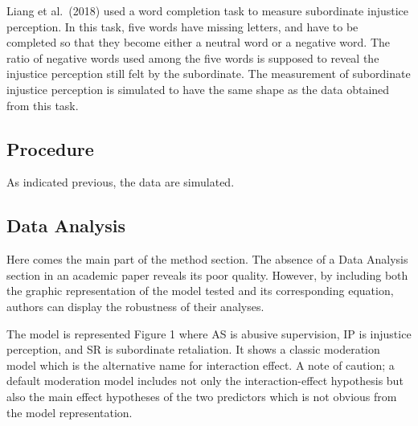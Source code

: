 \documentclass[
]{article}
\begin{document}
Liang et al.~(2018) used a word completion task to measure subordinate
injustice perception. In this task, five words have missing letters, and
have to be completed so that they become either a neutral word or a
negative word. The ratio of negative words used among the five words is
supposed to reveal the injustice perception still felt by the
subordinate. The measurement of subordinate injustice perception is
simulated to have the same shape as the data obtained from this task.

\hypertarget{procedure}{%
\subsection{Procedure}\label{procedure}}

As indicated previous, the data are simulated.

\hypertarget{data-analysis}{%
\subsection{Data Analysis}\label{data-analysis}}

Here comes the main part of the method section. The absence of a Data
Analysis section in an academic paper reveals its poor quality. However,
by including both the graphic representation of the model tested and its
corresponding equation, authors can display the robustness of their
analyses.

The model is represented Figure 1 where AS is abusive supervision, IP is
injustice perception, and SR is subordinate retaliation. It shows a
classic moderation model which is the alternative name for interaction
effect. A note of caution; a default moderation model includes not only
the interaction-effect hypothesis but also the main effect hypotheses of
the two predictors which is not obvious from the model representation.
\end{document}
